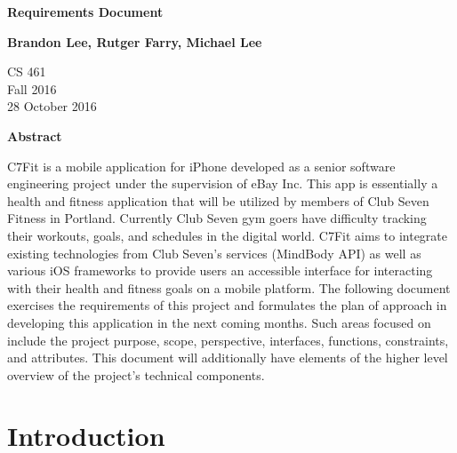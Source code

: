 \documentclass[letterpaper,10pt,titlepage]{article}
\begin{document}
\begin{titlepage}
    \begin{center}
        \vspace*{3.5cm}

        \textbf{Requirements Document}

        \vspace{0.5cm}

        \textbf{Brandon Lee, Rutger Farry, Michael Lee}

        \vspace{0.8cm}

        CS 461\\
        Fall 2016\\
        28 October 2016\\

        \vspace{1cm}

        \textbf{Abstract}\\

        \vspace{0.5cm}

        C7Fit is a mobile application for iPhone developed as a senior software engineering project under the supervision of eBay Inc. This app is essentially a health and fitness application that will be utilized by members of Club Seven Fitness in Portland. Currently Club Seven gym goers have difficulty tracking their workouts, goals, and schedules in the digital world.  C7Fit aims to integrate existing technologies from Club Seven's services (MindBody API) as well as various iOS frameworks to provide users an accessible interface for interacting with their health and fitness goals on a mobile platform. The following document exercises the requirements of this project and formulates the plan of approach in developing this application in the next coming months. Such areas focused on include the project purpose, scope, perspective, interfaces, functions, constraints, and attributes. This document will additionally have elements of the higher level overview of the project's technical components.

        \vfill

    \end{center}
\end{titlepage}

\newpage

\tableofcontents

\newpage

\section{Introduction}
\end{document}
